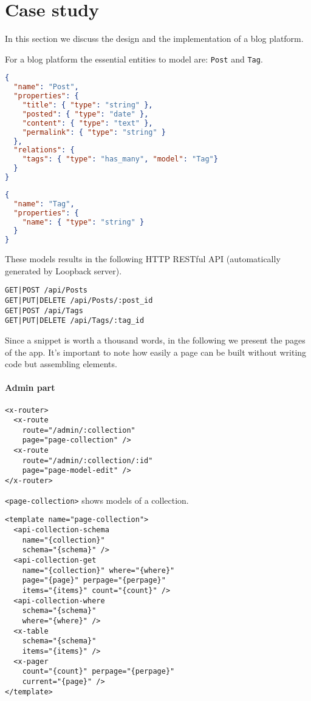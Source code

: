 \section{Case study}\label{sec:case-study}
In this section we discuss the design and the implementation of a blog platform. 

For a blog platform the essential entities to model are: \texttt{Post} and \texttt{Tag}.

\begin{lstlisting}[language=json]
{
  "name": "Post",
  "properties": {
    "title": { "type": "string" },
    "posted": { "type": "date" },
    "content": { "type": "text" },
    "permalink": { "type": "string" }
  }, 
  "relations": {
    "tags": { "type": "has_many", "model": "Tag"}
  }
}
\end{lstlisting}

\begin{lstlisting}[language=json]
{
  "name": "Tag",
  "properties": {
    "name": { "type": "string" }
  }
}
\end{lstlisting}

These models results in the following HTTP RESTful API (automatically generated by Loopback server).

\begin{lstlisting}
GET|POST /api/Posts
GET|PUT|DELETE /api/Posts/:post_id
GET|POST /api/Tags
GET|PUT|DELETE /api/Tags/:tag_id
\end{lstlisting}

Since a snippet is worth a thousand words, in the following we present the pages of the app.
It's important to note how easily a page can be built without writing code but assembling elements. 

\paragraph{Admin part}

\begin{lstlisting}[language=HTML5]
<x-router>
  <x-route 
    route="/admin/:collection" 
    page="page-collection" />
  <x-route 
    route="/admin/:collection/:id"
    page="page-model-edit" />
</x-router>
\end{lstlisting}

\texttt{<page-collection>} shows models of a collection.

\begin{lstlisting}[language=HTML5]
<template name="page-collection">
  <api-collection-schema
    name="{collection}"
    schema="{schema}" />
  <api-collection-get 
    name="{collection}" where="{where}" 
    page="{page}" perpage="{perpage}"  
    items="{items}" count="{count}" />
  <api-collection-where 
    schema="{schema}"
    where="{where}" />
  <x-table 
    schema="{schema}"
    items="{items}" />
  <x-pager 
    count="{count}" perpage="{perpage}"
    current="{page}" />
</template>
\end{lstlisting}



